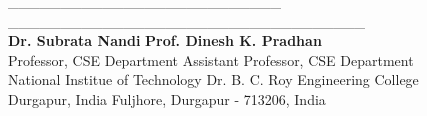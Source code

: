 \begin{titlepage}
\noindent
\_\_\_\_\_\_\_\_\_\_\_\_\_\_\_\_\_\_\_\_\_\_\_\_\_\_
\hfill  
\_\_\_\_\_\_\_\_\_\_\_\_\_\_\_\_\_\_\_\_\_\_\_\_\_\_\_\_\_\_\_\_\_\_\\
\noindent \textbf{Dr. Subrata Nandi}
\hspace{126pt} \textbf{Prof. Dinesh K. Pradhan}\\
Professor, CSE Department
\hspace{93pt}Assistant Professor, CSE Department\\
National Institue of Technology
\hspace{74pt}Dr. B. C. Roy Engineering College\\
Durgapur, India
\hspace{150pt}Fuljhore, Durgapur - 713206, India\\

\end{titlepage}




\mbox{}
\thispagestyle{empty}
\newpage






